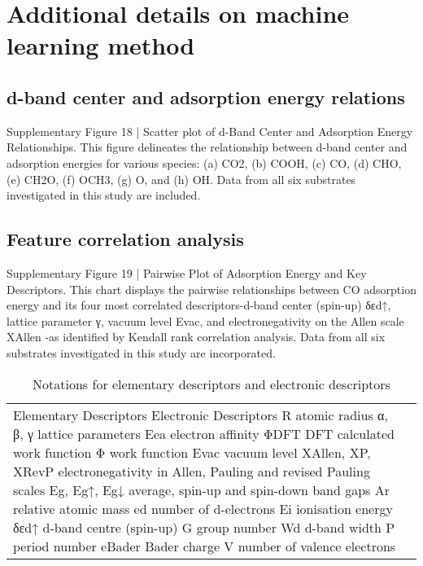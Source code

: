 

\section{Additional details on machine learning method}

\subsection{d-band center and adsorption energy relations}


Supplementary Figure 18 | Scatter plot of d-Band Center and Adsorption Energy Relationships. This figure delineates the relationship between d-band center and adsorption energies for various species: (a) CO2, (b) COOH, (c) CO, (d) CHO, (e) CH2O, (f) OCH3, (g) O, and (h) OH. Data from all six substrates investigated in this study are included.


\subsection{Feature correlation analysis}


Supplementary Figure 19 | Pairwise Plot of Adsorption Energy and Key Descriptors. This chart displays the pairwise relationships between CO adsorption energy and its four most correlated descriptors-d-band center (spin-up) δεd↑, lattice parameter γ, vacuum level Evac, and electronegativity on the Allen scale XAllen -as identified by Kendall rank correlation analysis. Data from all six substrates investigated in this study are incorporated.


\begin{table}[h]
    \centering
    \begin{tabular}{lr}
      \hline
      Elementary Descriptors	Electronic Descriptors
      \hline
      R	atomic radius	α, β, γ	lattice parameters
      Eea	electron affinity	ΦDFT	DFT calculated work function
      Φ	work function	Evac	vacuum level
      XAllen, ΧP, ΧRevP	electronegativity in Allen, Pauling and revised Pauling scales	Eg, Eg↑, Eg↓	average, spin-up and spin-down band gaps
      Ar	relative atomic mass	ed	number of d-electrons
      Ei	ionisation energy	δεd↑	d-band centre (spin-up)
      G	group number	Wd	d-band width
      P	period number	eBader	Bader charge
      V	number of valence electrons
      \hline
    \end{tabular}
    \caption{Notations for elementary descriptors and electronic descriptors}
    \label{si_table15}
\end{table}


